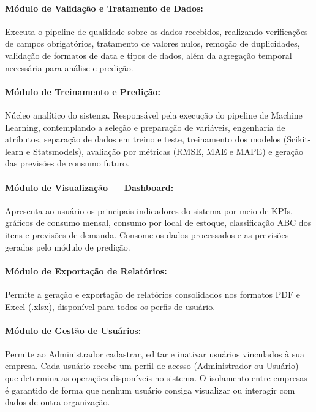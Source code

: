\documentclass[12pt,a4paper]{article}
\begin{document}
\paragraph{Módulo de Validação e Tratamento de Dados:}
Executa o pipeline de qualidade sobre os dados recebidos, realizando 
verificações de campos obrigatórios, tratamento de valores nulos, remoção 
de duplicidades, validação de formatos de data e tipos de dados, além da 
agregação temporal necessária para análise e predição.

\paragraph{Módulo de Treinamento e Predição:}
Núcleo analítico do sistema. Responsável pela execução do pipeline de 
Machine Learning, contemplando a seleção e preparação de variáveis, 
engenharia de atributos, separação de dados em treino e teste, treinamento 
dos modelos (Scikit-learn e Statsmodels), avaliação por métricas (RMSE, 
MAE e MAPE) e geração das previsões de consumo futuro.

\paragraph{Módulo de Visualização — Dashboard:}
Apresenta ao usuário os principais indicadores do sistema por meio de KPIs, 
gráficos de consumo mensal, consumo por local de estoque, classificação ABC 
dos itens e previsões de demanda. Consome os dados processados e as 
previsões geradas pelo módulo de predição.

\paragraph{Módulo de Exportação de Relatórios:}
Permite a geração e exportação de relatórios consolidados nos formatos PDF 
e Excel (.xlsx), disponível para todos os perfis de usuário.

\paragraph{Módulo de Gestão de Usuários:}
Permite ao Administrador cadastrar, editar e inativar usuários vinculados à sua empresa. Cada usuário recebe um perfil de acesso (Administrador ou Usuário) que determina as operações disponíveis no sistema. O isolamento entre empresas é garantido de forma que nenhum usuário consiga visualizar ou interagir com dados de outra organização.
\end{document}
